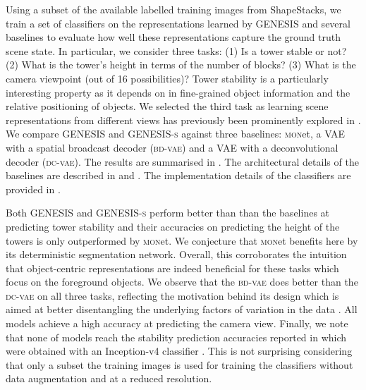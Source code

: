 \documentclass{article}
\begin{document}
Using a subset of the available labelled training images from ShapeStacks, we train a set of classifiers on the representations learned by \gls{GENESIS} and several baselines to evaluate how well these representations capture the ground truth scene state.
In particular, we consider three tasks: (1) Is a tower stable or not? (2) What is the tower's height in terms of the number of blocks? (3) What is the camera viewpoint (out of 16 possibilities)?
Tower stability is a particularly interesting property as it depends on in fine-grained object information and the relative positioning of objects.
We selected the third task as learning scene representations from different views has previously been prominently explored in \citet{eslami2018neural}.
We compare \gls{GENESIS} and \gls{GENESIS}\textsc{-s} against three baselines: \textsc{mon}et, a \gls{VAE} with a spatial broadcast decoder (\textsc{bd-vae}) and a \gls{VAE} with a deconvolutional decoder (\textsc{dc-vae}).
The results are summarised in .
The architectural details of the baselines are described in  and .
The implementation details of the classifiers are provided in .

\clearpage

Both \gls{GENESIS} and \gls{GENESIS}\textsc{-s} perform better than than the baselines at predicting tower stability and their accuracies on predicting the height of the towers is only outperformed by \textsc{mon}et.
We conjecture that \textsc{mon}et benefits here by its deterministic segmentation network.
Overall, this corroborates the intuition that object-centric representations are indeed beneficial for these tasks which focus on the foreground objects.
We observe that the \textsc{bd-vae} does better than the \textsc{dc-vae} on all three tasks, reflecting the motivation behind its design which is aimed at better disentangling the underlying factors of variation in the data \citep{watters2019spatial}.
All models achieve a high accuracy at predicting the camera view.
Finally, we note that none of models reach the stability prediction accuracies reported in \citet{groth2018shapestacks} which were obtained with an Inception-v4 classifier \citep{szegedy2017inception}.
This is not surprising considering that only a subset the training images is used for training the classifiers without data augmentation and at a reduced resolution.
\end{document}
